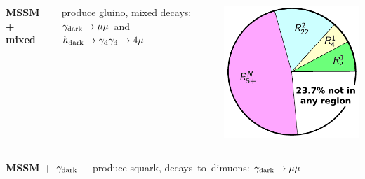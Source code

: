 \documentclass[compress]{beamer}
\newcommand{\s}[1]{{\mbox{\scriptsize #1}}}
\begin{document}
\begin{frame}
\begin{columns}
{\bf MSSM + mixed}

produce gluino, mixed decays: $\gamma_\s{dark} \to \mu\mu$ and \mbox{$h_\s{dark} \to \gamma_\s{d}\gamma_\s{d} \to 4\mu$\hspace{-1 cm}}

\includegraphics[width=\linewidth]{pie_u1.pdf}
\end{columns}

\vspace{0.25 cm}
\begin{columns}
{\bf MSSM + $\gamma_\s{dark}$}

produce squark, \mbox{decays to dimuons:\hspace{-0.25 cm}} $\gamma_\s{dark} \to \mu\mu$


\end{columns}
\end{frame}
\end{document}
